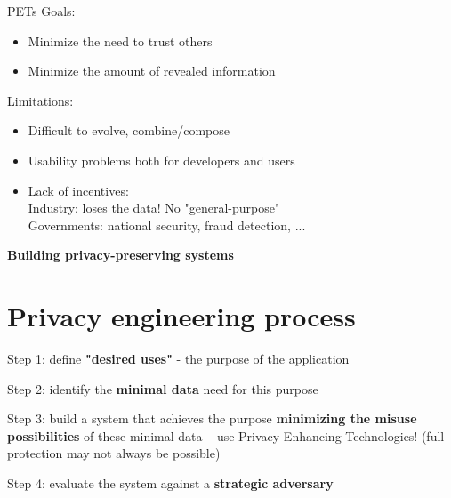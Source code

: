 \documentclass[11pt]{article}
\begin{document}
PETs Goals:
\begin{itemize}
	\item Minimize the need to trust others
	\item Minimize the amount of revealed information
\end{itemize}

Limitations:
\begin{itemize}
	\item Difficult to evolve, combine/compose
	\item Usability problems both for developers and users
	\item Lack of incentives: \\
	Industry: loses the data! No "general-purpose" \\
	Governments: national security, fraud detection, ...
\end{itemize}

\vspace{0.5cm}

\begin{center}
  {\LARGE \textbf{Building privacy-preserving systems}}
\end{center}
\vspace{0.5cm}

\section*{Privacy engineering process}

Step 1: define \textbf{"desired uses"} - the purpose of the application

Step 2: identify the \textbf{minimal data} need for this purpose

Step 3: build a system that achieves the purpose \textbf{minimizing the misuse possibilities} of these minimal data -- use Privacy Enhancing Technologies! (full protection may not always be possible)

Step 4: evaluate the system against a \textbf{strategic adversary}
\end{document}
